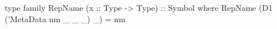 \begin{code}
type family RepName (x :: Type -> Type) :: Symbol where
  RepName (D1 ('MetaData nm _ _ _) _) = nm
\end{code}
